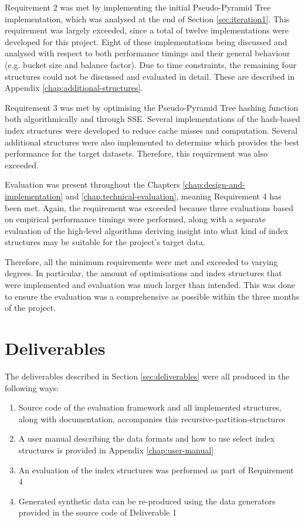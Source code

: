 Requirement 2 was met by implementing the initial Pseudo-Pyramid Tree implementation, which was analysed at the end of Section \ref{sec:iteration1}. This requirement was largely exceeded, since a total of twelve implementations were developed for this project. Eight of these implementations being discussed and analysed with respect to both performance timings and their general behaviour (e.g. bucket size and balance factor). Due to time constraints, the remaining four structures could not be discussed and evaluated in detail. These are described in Appendix \ref{chap:additional-structures}.

Requirement 3 was met by optimising the Pseudo-Pyramid Tree hashing function both algorithmically and through SSE. Several implementations of the hash-based index structures were developed to reduce cache misses and computation. Several additional structures were also implemented to determine which provides the best performance for the target datasets. Therefore, this requirement was also exceeded.

Evaluation was present throughout the Chapters \ref{chap:design-and-implementation} and \ref{chap:technical-evaluation}, meaning Requirement 4 has been met. Again, the requirement was exceeded because three evaluations based on empirical performance timings were performed, along with a separate evaluation of the high-level algorithms deriving insight into what kind of index structures may be suitable for the project's target data.

Therefore, all the minimum requirements were met and exceeded to varying degrees. In particular, the amount of optimisations and index structures that were implemented and evaluation was much larger than intended. This was done to ensure the evaluation was a comprehensive as possible within the three months of the project.

\section{Deliverables}

The deliverables described in Section \ref{sec:deliverables} were all produced in the following ways:
\begin{enumerate}
	\item Source code of the evaluation framework and all implemented structures, along with documentation, accompanies this recursive-partition-structures
	\item A user manual describing the data formats and how to use select index structures is provided in Appendix \ref{chap:user-manual}
	\item An evaluation of the index structures was performed as part of Requirement 4
	\item Generated synthetic data can be re-produced using the data generators provided in the source code of Deliverable 1
\end{enumerate}

